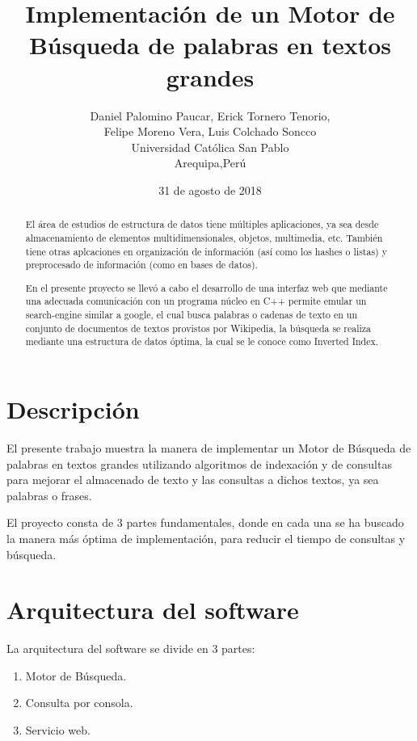 \documentclass[a4paper]{article}
\title{Implementación de un Motor de Búsqueda de palabras en textos grandes}
\author{Daniel Palomino Paucar, Erick Tornero Tenorio, \\
Felipe Moreno Vera, Luis Colchado Soncco\\
  \small Universidad Católica San Pablo\\
  \small Arequipa,Perú
  \date{31 de agosto de 2018}
}
\begin{document}
\maketitle

 
\begin{abstract}
El área de estudios de estructura de datos tiene múltiples aplicaciones, ya sea desde almacenamiento de elementos multidimensionales, objetos, multimedia, etc. También tiene otras aplcaciones en organización de información (así como los hashes o listas) y preprocesado de información (como en bases de datos).

En el presente proyecto se llevó a cabo el desarrollo de una interfaz web que mediante una adecuada comunicación con un programa núcleo en C++ permite emular un search-engine similar a google, el cual busca palabras o cadenas de texto en un conjunto de documentos de textos provistos por Wikipedia, la búsqueda se realiza mediante una estructura de datos óptima, la cual se le conoce como Inverted Index.


\end{abstract}


\section{Descripción}

El presente trabajo muestra la manera de implementar un Motor de Búsqueda de palabras en textos grandes utilizando algoritmos de indexación y de consultas para mejorar el almacenado de texto y las consultas a dichos textos, ya sea palabras o frases. 

El proyecto consta de 3 partes fundamentales, donde en cada una se ha buscado la manera más óptima de implementación, para reducir el tiempo de consultas y búsqueda.

\section{Arquitectura del software}

La arquitectura del software se divide en 3 partes:
\begin{enumerate}
    \item Motor de Búsqueda.
    \item Consulta por consola.
    \item Servicio web.
\end{enumerate}
\end{document}
